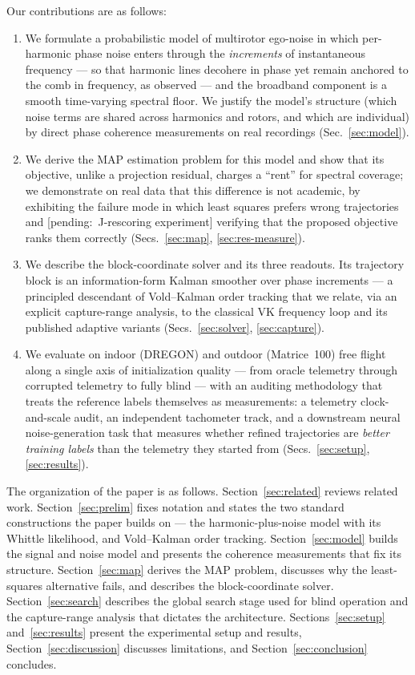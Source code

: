 \documentclass[journal]{IEEEtran}
\newcommand{\pending}[1]{{\color{gray}\textsf{[pending:~#1]}}}
\begin{document}
Our contributions are as follows:
\begin{enumerate}
\item We formulate a probabilistic model of multirotor ego-noise in
  which per-harmonic phase noise enters through the \emph{increments} of
  instantaneous frequency --- so that harmonic lines decohere in phase
  yet remain anchored to the comb in frequency, as observed --- and the
  broadband component is a smooth time-varying spectral floor. We
  justify the model's structure (which noise terms are shared across
  harmonics and rotors, and which are individual) by direct phase
  coherence measurements on real recordings
  (Sec.~\ref{sec:model}).
\item We derive the MAP estimation problem for this model and show that
  its objective, unlike a projection residual, charges a ``rent'' for
  spectral coverage; we demonstrate on real data that this difference is
  not academic, by exhibiting the failure mode in which least squares
  prefers wrong trajectories and \pending{J-rescoring experiment}
  verifying that the proposed objective ranks them correctly
  (Secs.~\ref{sec:map}, \ref{sec:res-measure}).
\item We describe the block-coordinate solver and its three readouts.
  Its trajectory block is an information-form Kalman smoother over
  phase increments --- a principled descendant of Vold--Kalman order
  tracking that we relate, via an explicit capture-range analysis, to
  the classical VK frequency loop and its published adaptive variants
  (Secs.~\ref{sec:solver}, \ref{sec:capture}).
\item We evaluate on indoor (DREGON) and outdoor (Matrice~100) free
  flight along a single axis of initialization quality --- from oracle
  telemetry through corrupted telemetry to fully blind --- with an
  auditing methodology that treats the reference labels themselves as
  measurements: a telemetry clock-and-scale audit, an independent
  tachometer track, and a downstream neural noise-generation task that
  measures whether refined trajectories are \emph{better training
  labels} than the telemetry they started from
  (Secs.~\ref{sec:setup}, \ref{sec:results}).
\end{enumerate}

The organization of the paper is as follows. Section~\ref{sec:related}
reviews related work. Section~\ref{sec:prelim} fixes notation and
states the two standard constructions the paper builds on --- the
harmonic-plus-noise model with its Whittle likelihood, and Vold--Kalman
order tracking. Section~\ref{sec:model} builds the signal and noise
model and presents the coherence measurements that fix its structure.
Section~\ref{sec:map} derives the MAP problem, discusses why the
least-squares alternative fails, and describes the block-coordinate
solver. Section~\ref{sec:search} describes the global search stage used
for blind operation and the capture-range analysis that dictates the
architecture. Sections~\ref{sec:setup} and~\ref{sec:results} present the
experimental setup and results, Section~\ref{sec:discussion} discusses
limitations, and Section~\ref{sec:conclusion} concludes.
\end{document}
